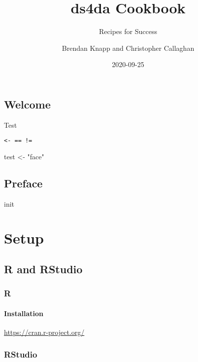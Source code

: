 \documentclass[
]{book}
\title{ds4da Cookbook}
\subtitle{Recipes for Success}
\author{Brendan Knapp and Christopher Callaghan}
\date{2020-09-25}
\newenvironment{Shaded}{\begin{snugshade}}{\end{snugshade}}
\newcommand{\NormalTok}[1]{#1}
\newcommand{\StringTok}[1]{\textcolor[rgb]{0.31,0.60,0.02}{#1}}
\begin{document}
\maketitle

{
\setcounter{tocdepth}{1}
\tableofcontents
}
\hypertarget{welcome}{%
\chapter*{Welcome}\label{welcome}}

Test

\texttt{\textless{}-\ ==\ !=}

\begin{Shaded}
\begin{Highlighting}[]
\NormalTok{test <-}\StringTok{ "face"}
\end{Highlighting}
\end{Shaded}

\hypertarget{preface}{%
\chapter*{Preface}\label{preface}}

init

\cleardoublepage

\hypertarget{part-setup}{%
\part{Setup}\label{part-setup}}

\hypertarget{setup-r-and-rstudio}{%
\chapter{R and RStudio}\label{setup-r-and-rstudio}}

\hypertarget{r}{%
\section{R}\label{r}}

\hypertarget{installation}{%
\subsection{Installation}\label{installation}}

\url{https://cran.r-project.org/}

\hypertarget{rstudio}{%
\section{RStudio}\label{rstudio}}
\end{document}
